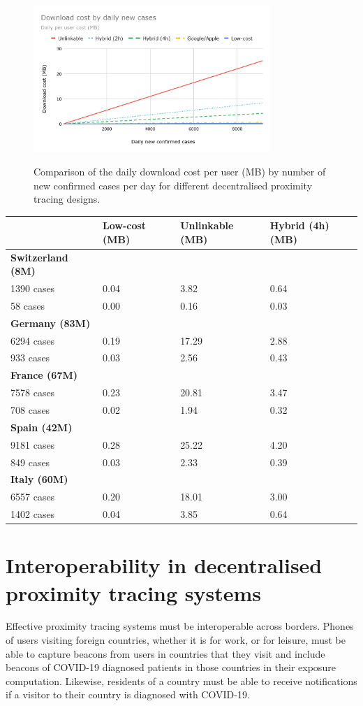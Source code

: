 \documentclass{article}
\begin{document}
\begin{figure}\centering
\includegraphics[width=0.8\textwidth]{figs/comparison_decentralized.png}
\label{fig:comp_decentralized}
\caption{Comparison of the daily download cost per user (MB)
by number of new confirmed cases per day for different decentralised
proximity tracing designs.}
\end{figure}


\begin{tabular}[]{@{}llll@{}}
\toprule
& \textbf{Low-cost (MB)} & \textbf{Unlinkable (MB)} & \textbf{Hybrid
(4h) (MB)}\tabularnewline
\midrule
\textbf{Switzerland (8M)} & & &\tabularnewline
1390 cases & 0.04 & 3.82 & 0.64\tabularnewline
58 cases & 0.00 & 0.16 & 0.03\tabularnewline
\textbf{Germany (83M)} & & &\tabularnewline
6294 cases & 0.19 & 17.29 & 2.88\tabularnewline
933 cases & 0.03 & 2.56 & 0.43\tabularnewline
\textbf{France (67M)} & & &\tabularnewline
7578 cases & 0.23 & 20.81 & 3.47\tabularnewline
708 cases & 0.02 & 1.94 & 0.32\tabularnewline
\textbf{Spain (42M)} & & &\tabularnewline
9181 cases & 0.28 & 25.22 & 4.20\tabularnewline
849 cases & 0.03 & 2.33 & 0.39\tabularnewline
\textbf{Italy (60M)} & & &\tabularnewline
6557 cases & 0.20 & 18.01 & 3.00\tabularnewline
1402 cases & 0.04 & 3.85 & 0.64\tabularnewline
\bottomrule
\end{tabular}

\section{Interoperability in decentralised proximity tracing
systems}\label{interoperability-in-decentralised-proximity-tracing-systems}

Effective proximity tracing systems must be interoperable across
borders. Phones of users visiting foreign countries, whether it is for
work, or for leisure, must be able to capture beacons from users in
countries that they visit and include beacons of COVID-19 diagnosed
patients in those countries in their exposure computation. Likewise,
residents of a country must be able to receive notifications if a
visitor to their country is diagnosed with COVID-19.
\end{document}
